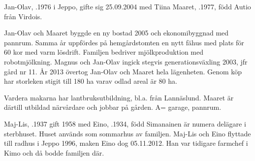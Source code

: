 


Jan-Olav, .1976 i Jeppo, gifte sig 25.09.2004 med Tiina Maaret, .1977, född Autio från Virdois.
\begin{jhchildren}
  \item {}
  \item {}
  \item {}
  \item {}
  \item {}
\end{jhchildren}

Jan-Olav och Maaret byggde en ny bostad 2005 och ekonomibyggnad med pannrum. Samma år uppfördes på hemgårdstomten en nytt fähus med plats för 60 kor med varm lösdrift. Familjen bedriver mjölkproduktion med robotmjölkning. Magnus och Jan-Olav ingick stegvis generationsväxling 2003, jfr gård nr 11. År 2013 övertog Jan-Olav och Maaret hela lägenheten. Genom köp har storleken stigit till 180 ha varav odlad areal är 80 ha.

Vardera makarna har lantbruksutbildning, bl.a. från Lannäslund. Maaret är därtill utbildad närvårdare och jobbar på gården. A= garage, pannrum.






Maj-Lis, .1937 gift 1958 med Eino, .1934, född Simanainen är numera delägare i sterbhuset.  Huset används som sommarhus av familjen. Maj-Lis och Eino flyttade till radhus i Jeppo 1996, maken Eino dog 05.11.2012. Han var tidigare farmchef i Kimo och då bodde familjen där.\jhvspace{}


